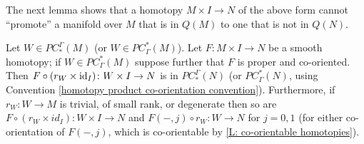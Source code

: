 The next lemma shows that a homotopy $M \times I \to N$ of the above form cannot ``promote'' a manifold over $M$ that is in $Q(M)$ to one that is not in $Q(N)$.

\begin{lemma}\label{L: desiccated homotopy}
	Let $W \in PC_*^\Gamma(M)$ (or $W \in PC^*_\Gamma(M)$).
	Let $F \colon M \times I \to N$ be a smooth homotopy; if $W \in PC^*_\Gamma(M)$ suppose further that $F$ is proper and co-oriented.
	Then $F \circ (r_W \times \mathrm{id}_I) \colon W \times I \to N$ is in $PC_*^\Gamma(N)$ (or $PC^*_\Gamma(N)$, using Convention \ref{homotopy product co-orientation convention}).
	Furthermore,
	if $r_W \colon W \to M$ is trivial, of small rank, or degenerate then so are
	$F \circ (r_W \times id_I) \colon W \times I \to N$ and $F(-,j) \circ r_W \colon W \to N$ for $j=0,1$ (for either co-orientation of $F(-,j)$, which is co-orientable by \cref{L: co-orientable homotopies}).
\end{lemma}

